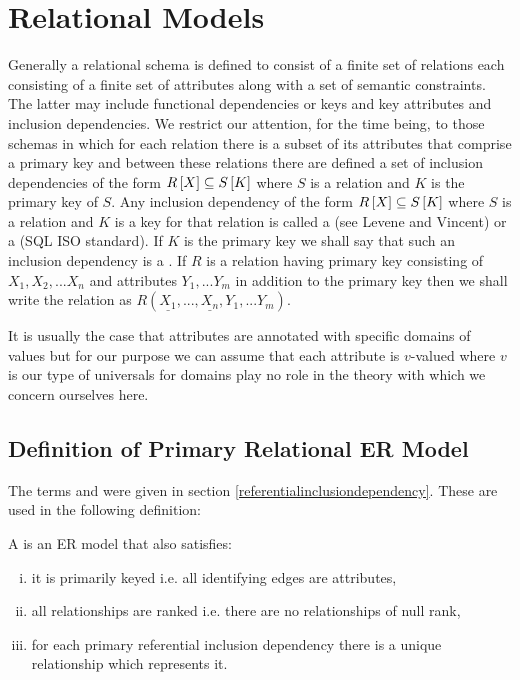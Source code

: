 \section{Relational Models}
\label{definitionofrelational}
Generally a relational schema is defined to consist of a finite set of relations each consisting of a
finite set of attributes along with a set of semantic constraints. The latter may include functional dependencies or keys and key attributes and inclusion dependencies.  We restrict our attention, for the time being, to those schemas in which for each relation there is a subset of its attributes that comprise a primary key and between these relations there are defined  a set of inclusion dependencies of the 
form $R\left[X\right]\subseteq S\left[K\right]$ where $S$ is a relation and $K$ is the primary key of $S$.
Any inclusion dependency of the form $R\left[X\right]\subseteq S\left[K\right]$ where $S$ is a relation and $K$ is a key for that relation is called a  (see Levene and Vincent) or a  (SQL ISO standard).
If $K$ is the primary key we shall say that such an inclusion dependency is a . If $R$ is a relation having primary key consisting
of $X_1,X_2,...X_n$ and attributes $Y_1,...Y_m$ in addition to the primary key 
 then we shall write the relation as $R(\underline{X_1},...,\underline{X_n},Y_1,...Y_m)$.

It is usually the case that attributes are annotated with specific domains of values but for our purpose we can assume that each attribute is $v$-valued where $v$ is our type of universals for domains play no role in the theory with which we concern ourselves here.
\subsection{Definition of Primary Relational ER Model}
The terms  and 
 were given in 
section \ref{referentialinclusiondependency}. These are used in the following definition:
\begin{definition}
\noindent 
A  is an  ER model that also satisfies:
\begin{enumerate}[(i)]
\item
it is primarily keyed i.e. all identifying edges are attributes, 
\item
all relationships are ranked i.e. there are no relationships of null rank,
\item 
for each primary referential inclusion dependency there is a unique relationship which represents it.
\end{enumerate} 
\end{definition}


